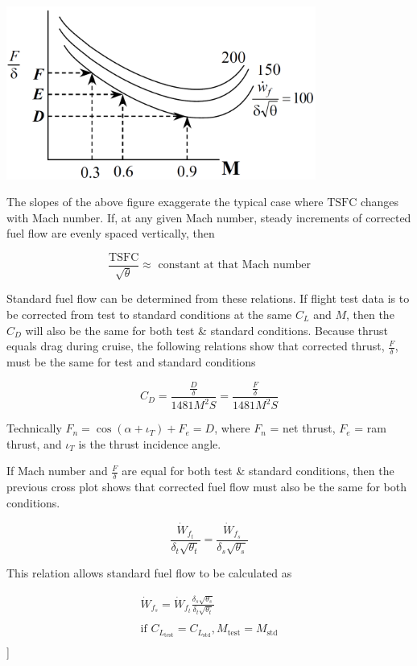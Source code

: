 \documentclass[
]{book}
\begin{document}
\includegraphics[width=4in,height=\textheight]{media/12/corr-thrust-m.png}

The slopes of the above figure exaggerate the typical case where
\(\mathrm{TSFC}\) changes with Mach number. If, at any given Mach number, steady
increments of corrected fuel flow are evenly spaced vertically, then

\[
\frac{\mathrm{TSFC}}{\sqrt{\theta}} \approx \text{ constant at that Mach number}
\]

Standard fuel flow can be determined from these relations. If flight test data
is to be corrected from test to standard conditions at the same \(C_L\) and
\(M\), then the \(C_D\) will also be the same for both test \& standard
conditions. Because thrust equals drag during cruise, the following relations
show that corrected thrust, \(\frac{F}{\delta}\), must be the same for test and standard conditions

\[
C_D = \frac{\frac{D}{\delta}}{1481 M^2 S} = \frac{\frac{F}{\delta}}{1481 M^2 S}
\]

Technically \(F_n = \cos \left( \alpha + \iota_T \right) + F_e = D\), where
\(F_n\) = net thrust, \(F_e\) = ram thrust, and \(\iota_T\) is the thrust
incidence angle.

If Mach number and \(\frac{F}{\delta}\) are equal for both test \& standard
conditions, then the previous cross plot shows that corrected fuel flow must
also be the same for both conditions.

\[
\frac{\dot{W}_{f_t}}{\delta_t \sqrt{\theta_t}} = \frac{\dot{W}_{f_s}}{\delta_s \sqrt{\theta_s}}
\]

This relation allows standard fuel flow to be calculated as

\begin{align}
\dot{W}_{f_s} = \dot{W}_{f_t} \frac{\delta_s \sqrt{\theta_s}}{\delta_t \sqrt{\theta_t}} \\
\\
\text{if } C_{L_{\text{test}}} = C_{L_{\text{std}}}, M_{\text{test}} = M_{\text{std}} \\
\end{align}
\label{eq:std-fuel-flow}
{]}
\end{document}
